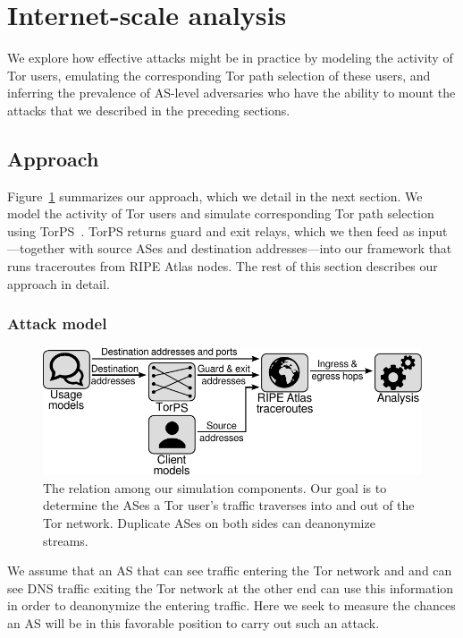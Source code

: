 \section{Internet-scale analysis}
\label{sec:internet-scale}

We explore how effective \name attacks might be in
practice by modeling the activity of Tor users, emulating the
corresponding Tor path selection of these users, and inferring  the
prevalence of AS-level adversaries who have the ability to
mount the attacks that we described in the preceding sections.

\subsection{Approach}

Figure~\ref{fig:simulations} summarizes our approach, which we detail in
the next section. We model the activity of Tor users and simulate
corresponding Tor path selection using TorPS~\cite{TorPS}.  TorPS
returns guard and exit relays, which we then feed as input---together
with source ASes and destination addresses---into our framework that
runs traceroutes from RIPE Atlas nodes.  The rest of this section
describes our approach in detail.

\subsubsection{Attack model}

\begin{figure}[t]
	\centering
	\includegraphics[width=\linewidth]{figures/simulations.pdf}
	\caption{The relation among our simulation components.  Our goal is to
	determine the ASes a Tor user's traffic traverses into and out of the Tor
	network.  Duplicate ASes on both sides can deanonymize streams.}
	\label{fig:simulations}
\end{figure}

We assume that an AS that can see traffic entering the Tor network and
and can see DNS traffic exiting the Tor network at the other end can use
this information in order to deanonymize the entering traffic.  Here we
seek to measure the chances an AS will be in this favorable position to
carry out such an attack.

